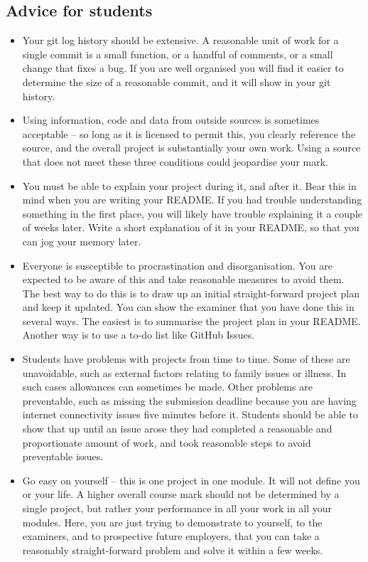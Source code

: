 \documentclass[12pt, a4paper]{article}
\begin{document}
\subsection*{Advice for students}
\begin{itemize}
    \item
    Your git log history should be extensive.
    A reasonable unit of work for a single commit is a small function, or a handful of comments, or a small change that fixes a bug.
    If you are well organised you will find it easier to determine the size of a reasonable commit, and it will show in your git history.
    \item
    Using information, code and data from outside sources is sometimes acceptable -- so long as it is licensed to permit this, you clearly reference the source, and the overall project is substantially your own work.
    Using a source that does not meet these three conditions could jeopardise your mark.
    \item
    You must be able to explain your project during it, and after it.
    Bear this in mind when you are writing your README.
    If you had trouble understanding something in the first place, you will likely have trouble explaining it a couple of weeks later.
    Write a short explanation of it in your README, so that you can jog your memory later.
    \item
    Everyone is susceptible to procrastination and disorganisation.
    You are expected to be aware of this and take reasonable measures to avoid them.
    The best way to do this is to draw up an initial straight-forward project plan and keep it updated.
    You can show the examiner that you have done this in several ways.
    The easiest is to summarise the project plan in your README.
    Another way is to use a to-do list like GitHub Issues.
    \item
    Students have problems with projects from time to time.
    Some of these are unavoidable, such as external factors relating to family issues or illness.
    In such cases allowances can sometimes be made.
    Other problems are preventable, such as missing the submission deadline because you are having internet connectivity issues five minutes before it.
    Students should be able to show that up until an issue arose they had completed a reasonable and proportionate amount of work, and took reasonable steps to avoid preventable issues.
    \item
    Go easy on yourself -- this is one project in one module.
    It will not define you or your life.
    A higher overall course mark should not be determined by a single project, but rather your performance in all your work in all your modules.
    Here, you are just trying to demonstrate to yourself, to the examiners, and to prospective future employers, that you can take a reasonably straight-forward problem and solve it within a few weeks.
\end{itemize}




\end{document}
